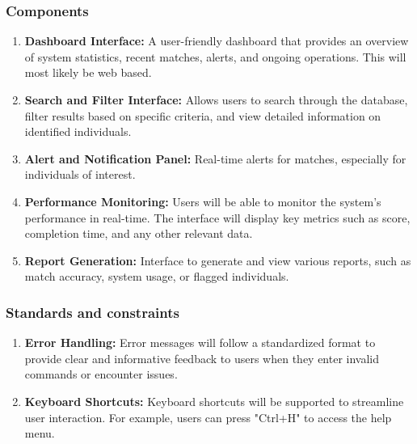         \subsubsection{Components}
            \begin{enumerate}
                \item \textbf{Dashboard Interface:} A user-friendly dashboard that provides an overview of system statistics, recent matches, alerts, and ongoing operations. This will most likely be web based.
                \item \textbf{Search and Filter Interface:} Allows users to search through the database, filter results based on specific criteria, and view detailed information on identified individuals.
                \item \textbf{Alert and Notification Panel:}  Real-time alerts for matches, especially for individuals of interest.
                \item \textbf{Performance Monitoring:} Users will be able to monitor the system's performance in real-time. The interface will display key metrics such as score, completion time, and any other relevant data.
                \item \textbf{Report Generation:} Interface to generate and view various reports, such as match accuracy, system usage, or flagged individuals.
            \end{enumerate}
        \subsubsection{Standards and constraints}
            \begin{enumerate}
                \item \textbf{Error Handling:} Error messages will follow a standardized format to provide clear and informative feedback to users when they enter invalid commands or encounter issues.
                \item \textbf{Keyboard Shortcuts:} Keyboard shortcuts will be supported to streamline user interaction. For example, users can press "Ctrl+H" to access the help menu.
            \end{enumerate}
    
